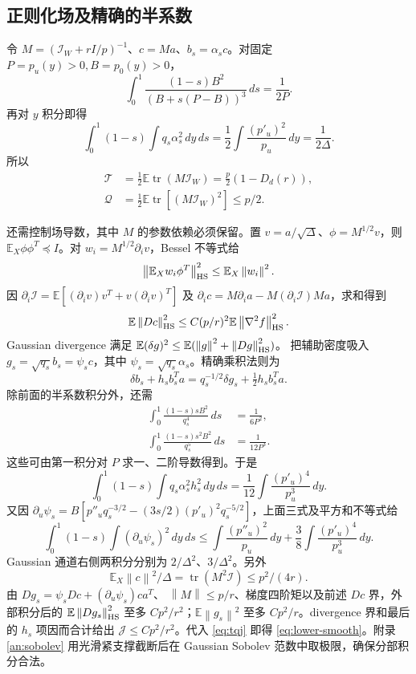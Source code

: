 \documentclass[a4paper]{tufte-handout}
\newcommand{\E}{\mathbb E}
\newcommand{\I}{\mathcal I}
\newcommand{\norm}[1]{\left\|#1\right\|}
\DeclareMathOperator{\tr}{tr}
\begin{document}
\begin{fullwidth}
\subsection{正则化场及精确的半系数}
令 $M=(\I_W+rI/p)^{-1}$、$c=Ma$、$b_s=\alpha_sc$。对固定 $P=p_u(y)>0,B=p_0(y)>0$，
\[
\int_0^1\frac{(1-s)B^2}{(B+s(P-B))^3}\,ds=\frac1{2P}.
\]
再对 $y$ 积分即得
\[
\int_0^1(1-s)\int q_s\alpha_s^2\,dy\,ds
=\frac12\int\frac{(p'_u)^2}{p_u}\,dy=\frac1{2\Delta}.
\]
所以
\begin{equation}\begin{aligned}
\mathcal T&=\tfrac12\E\tr(M\I_W)=\tfrac p2(1-D_d(r)),\\
\mathcal Q&=\tfrac12\E\tr[(M\I_W)^2]\le p/2.
\end{aligned}\end{equation}

还需控制场导数，其中 $M$ 的参数依赖必须保留。置 $v=a/\sqrt\Delta$、$\phi=M^{1/2}v$，则 $\E_X\phi\phi^T\preceq I$。对 $w_i=M^{1/2}\partial_iv$，Bessel 不等式给
\[
\norm{\E_Xw_i\phi^T}_{\rm HS}^2\le\E_X\norm{w_i}^2.
\]
因 $\partial_i\I=\E[(\partial_iv)v^T+v(\partial_iv)^T]$ 及
$\partial_ic=M\partial_ia-M(\partial_i\I)Ma$，求和得到
\[
\E\norm{Dc}_{\rm HS}^2\le C(p/r)^2\E\norm{\nabla^2f}_{\rm HS}^2.
\]
Gaussian divergence 满足
$\E(\delta g)^2\le\E(\norm g^2+\norm{Dg}_{\rm HS}^2)$。
把辅助密度吸入 $g_s=\sqrt{q_s}b_s=\psi_sc$，其中 $\psi_s=\sqrt{q_s}\alpha_s$。精确乘积法则为
\[
\delta b_s+h_sb_s^Ta=q_s^{-1/2}\delta g_s+\tfrac12h_sb_s^Ta.
\]
除前面的半系数积分外，还需
\begin{align*}
\int_0^1\frac{(1-s)sB^2}{q_s^4}\,ds&=\frac1{6P^2},\\
\int_0^1\frac{(1-s)s^2B^2}{q_s^5}\,ds&=\frac1{12P^3}.
\end{align*}
这些可由第一积分对 $P$ 求一、二阶导数得到。于是
\[
\int_0^1(1-s)\int q_s\alpha_s^2h_s^2\,dy\,ds
=\frac1{12}\int\frac{(p'_u)^4}{p_u^3}\,dy.
\]
又因 $\partial_u\psi_s=B[p''_uq_s^{-3/2}-(3s/2)(p'_u)^2q_s^{-5/2}]$，上面三式及平方和不等式给
\[
\int_0^1(1-s)\int(\partial_u\psi_s)^2\,dy\,ds
\le\int\frac{(p''_u)^2}{p_u}\,dy
+\frac38\int\frac{(p'_u)^4}{p_u^3}\,dy.
\]
Gaussian 通道右侧两积分分别为 $2/\Delta^2$、$3/\Delta^2$。另外
\[
\E_X\norm{c}^2/\Delta=\tr(M^2\I)\le p^2/(4r).
\]
由 $Dg_s=\psi_sDc+(\partial_u\psi_s)ca^T$、
$\norm M\le p/r$、梯度四阶矩以及前述 $Dc$ 界，外部积分后的 $\E\norm{Dg_s}_{\rm HS}^2$ 至多 $Cp^2/r^2$；$\E\norm{g_s}^2$ 至多 $Cp^2/r$。divergence 界和最后的 $h_s$ 项因而合计给出
$\mathcal J\le Cp^2/r^2$。代入 \eqref{eq:tqj} 即得 \eqref{eq:lower-smooth}。附录 \ref{an:sobolev} 用光滑紧支撑截断后在 Gaussian Sobolev 范数中取极限，确保分部积分合法。


\end{fullwidth}
\end{document}
